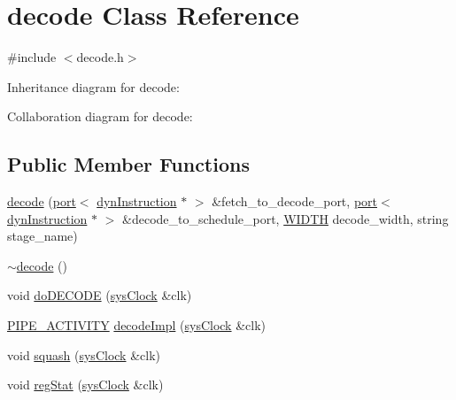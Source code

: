 \hypertarget{classdecode}{
\section{decode Class Reference}
\label{classdecode}
}


{\ttfamily \#include $<$decode.h$>$}



Inheritance diagram for decode:


Collaboration diagram for decode:
\subsection*{Public Member Functions}
\begin{DoxyCompactItemize}
\item 
\hyperlink{classdecode_ab0005a9e70d29e5d47a907f33c704e7b}{decode} (\hyperlink{classport}{port}$<$ \hyperlink{classdynInstruction}{dynInstruction} $\ast$ $>$ \&fetch\_\-to\_\-decode\_\-port, \hyperlink{classport}{port}$<$ \hyperlink{classdynInstruction}{dynInstruction} $\ast$ $>$ \&decode\_\-to\_\-schedule\_\-port, \hyperlink{global_2global_8h_a6fa2e24b8a418fa215e183264cbea3aa}{WIDTH} decode\_\-width, string stage\_\-name)
\item 
\hyperlink{classdecode_a4a0499a33c3e1465a0863b976f6b4c5a}{$\sim$decode} ()
\item 
void \hyperlink{classdecode_a387fdd64ecb79472fad23d4190b80516}{doDECODE} (\hyperlink{classsysClock}{sysClock} \&clk)
\item 
\hyperlink{unit_2stage_8h_ab00e4188e8b8974fecb1dfd12764cbb1}{PIPE\_\-ACTIVITY} \hyperlink{classdecode_a4971894a17f1aca1f8a562774949dd1e}{decodeImpl} (\hyperlink{classsysClock}{sysClock} \&clk)
\item 
void \hyperlink{classdecode_afed951843a1cc2c9f9f044caa7c009f1}{squash} (\hyperlink{classsysClock}{sysClock} \&clk)
\item 
void \hyperlink{classdecode_aa9758b61373caf22cabe72ed17006385}{regStat} (\hyperlink{classsysClock}{sysClock} \&clk)
\end{DoxyCompactItemize}



